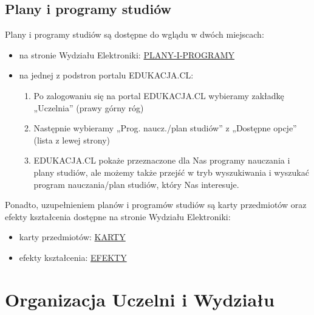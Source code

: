 \documentclass[11pt]{article}
\begin{document}
\subsection{Plany i programy studiów}
\indent \hspace{0.5cm} Plany i programy studiów są dostępne do wglądu w dwóch miejscach:
\begin{itemize}
\item na stronie Wydziału Elektroniki: 
{\color{blue}\href{http://weka.pwr.edu.pl/studenci/plany-i-programy-studiow/plany-i-programy-studiow}{PLANY-I-PROGRAMY}}
\item na jednej z podstron portalu EDUKACJA.CL:
\begin{enumerate}
\item Po zalogowaniu się na portal EDUKACJA.CL wybieramy zakładkę „Uczelnia” (prawy górny róg)
\item Następnie wybieramy „Prog. naucz./plan studiów” z „Dostępne opcje” 
(lista z lewej strony)
\item EDUKACJA.CL pokaże przeznaczone dla Nas programy nauczania i plany studiów, ale możemy także przejść w tryb wyszukiwania i wyszukać program nauczania/plan studiów, który Nas interesuje.
\end{enumerate}
\end{itemize}
\indent \hspace{0.5cm} Ponadto, uzupełnieniem planów i programów studiów są karty przedmiotów oraz efekty kształcenia dostępne na stronie Wydziału Elektroniki:
\begin{itemize}
    \item karty przedmiotów:
    {\color{blue}\href{http://weka.pwr.edu.pl/studenci/plany-i-programy-studiow/karty-przedmiotow}{KARTY}}
    \item efekty kształcenia:
    {\color{blue}\href{http://weka.pwr.edu.pl/studenci/plany-i-programy-studiow/efekty-ksztalcenia}{EFEKTY}}
\end{itemize}

\newpage
\section{Organizacja Uczelni i Wydziału}
\end{document}
